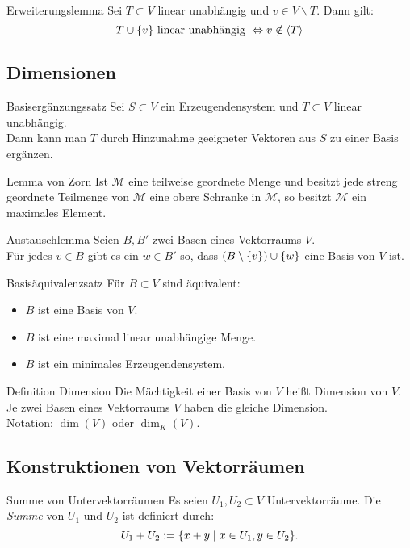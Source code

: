 \documentclass[main.tex]{subfiles}
\begin{document}
\begin{karte}{Erweiterungslemma}
    Sei \(T \subset V\) linear unabhängig und \(v \in V \backslash T \). Dann gilt: 
    \[T \cup \{v\} \text{ linear unabhängig } 
    \Leftrightarrow v \notin \langle T \rangle \]
\end{karte}
\subsection*{Dimensionen}
\begin{karte}{Basisergänzungssatz}
    Sei \(S \subset V\) ein Erzeugendensystem und \(T \subset V\)
    linear unabhängig. \\
    Dann kann man \(T\) durch Hinzunahme geeigneter Vektoren aus \(S\)
    zu einer Basis ergänzen.
\end{karte}
\begin{karte}{Lemma von Zorn}
    Ist \(\mathcal{M}\) eine teilweise geordnete Menge und besitzt
    jede streng geordnete Teilmenge von \(\mathcal{M}\) eine obere 
    Schranke in \(\mathcal{M}\), so besitzt \(\mathcal{M}\) 
    ein maximales Element.
\end{karte}
\begin{karte}{Austauschlemma}
    Seien \(B, B'\) zwei Basen eines Vektorraums \(V\). \\ 
    Für jedes \(v \in B \) gibt es ein \(w \in B'\) so, 
    dass \((B \setminus \{v\}) \cup \{w\}\) 
    eine Basis von \(V\) ist.
\end{karte}
\begin{karte}{Basisäquivalenzsatz} %
    Für \(B \subset V\) sind äquivalent: 
    \begin{itemize}
        \item \(B\) ist eine Basis von \(V\).
        \item \(B\) ist eine maximal linear unabhängige Menge.
        \item \(B\) ist ein minimales Erzeugendensystem.
    \end{itemize}
\end{karte}
\begin{karte}{Definition Dimension}
    Die Mächtigkeit einer Basis von \(V\) heißt Dimension von \(V\). \\ 
    Je zwei Basen eines Vektorraums \(V\) haben die gleiche Dimension. \\
    Notation: \( \dim(V) \) oder \( \dim_K(V) \).
\end{karte}
\subsection*{Konstruktionen von Vektorräumen}
\begin{karte}{Summe von Untervektorräumen}
    Es seien \( U_1, U_2 \subset V \) Untervektorräume. 
    Die \textit{Summe} von \( U_1 \) und \( U_2 \) ist 
    definiert durch:
    \[ U_1 + U_2 := \{ x + y \;\vert \; x \in U_1, y \in U_2 \}. \]
\end{karte}
\end{document}
